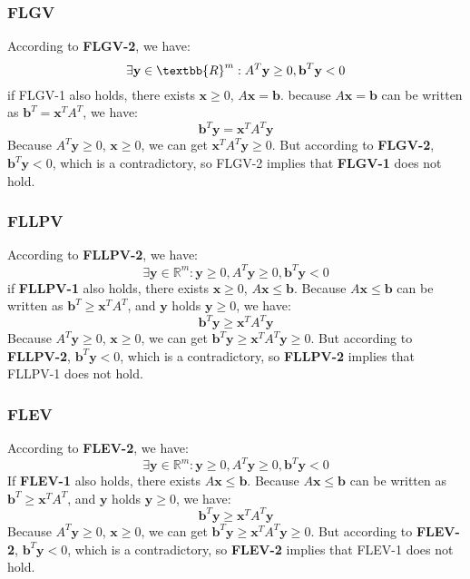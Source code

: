 \subsubsection*{FLGV}
According to \textbf{FLGV-2}, we have:
\[\exists \textbf{y} \in \textbb{R}^{m}: A^{T}\textbf{y} \geq 0, \textbf{b}^{T}\textbf{y} < 0 \]
if FLGV-1 also holds, there exists $\textbf{x} \geq 0$, $A\textbf{x}=\textbf{b}$.
\noindent
because $A\textbf{x}=\textbf{b}$ can be written as $\textbf{b}^{T} = \textbf{x}^{T}A^{T}$, we have:
\[\textbf{b}^{T}\textbf{y}=\textbf{x}^{T}A^{T}\textbf{y}\]
Because $A^{T}\textbf{y} \geq 0$, $\textbf{x} \geq 0$, we can get $\textbf{x}^{T}A^{T}\textbf{y} \geq 0$. But according to \textbf{FLGV-2}, $\textbf{b}^{T}\textbf{y} < 0$, which is a contradictory, so FLGV-2 implies that \textbf{FLGV-1} does not hold.
\subsubsection*{FLLPV}
According to \textbf{FLLPV-2}, we have:
\[\exists \textbf{y} \in \mathbb{R}^{m}: \textbf{y} \geq 0, A^{T}\textbf{y} \geq 0, \textbf{b}^{T}\textbf{y} < 0 \]
if \textbf{FLLPV-1} also holds, there exists $\textbf{x} \geq 0$, $A\textbf{x} \leq \textbf{b}$. Because $A\textbf{x} \leq \textbf{b}$ can be written as $\textbf{b}^{T} \geq \textbf{x}^{T}A^{T}$, and $\textbf{y}$ holds $\textbf{y} \geq 0$, we have:
\[\textbf{b}^{T}\textbf{y} \geq \textbf{x}^{T}A^{T}\textbf{y}\]
Because $A^{T}\textbf{y} \geq 0$, $\textbf{x} \geq 0$, we can get $\textbf{b}^{T}\textbf{y} \geq \textbf{x}^{T}A^{T}\textbf{y} \geq 0$.
But according to \textbf{FLLPV-2}, $\textbf{b}^{T}\textbf{y} < 0$, which is a contradictory, so \textbf{FLLPV-2} implies that FLLPV-1 does not hold.
\subsubsection*{FLEV}
According to \textbf{FLEV-2}, we have:
\[\exists \textbf{y} \in \mathbb{R}^{m}: \textbf{y} \geq 0, A^{T}\textbf{y} \geq 0, \textbf{b}^{T}\textbf{y} < 0 \]
If \textbf{FLEV-1} also holds, there exists $A\textbf{x} \leq \textbf{b}$.
Because $A\textbf{x} \leq \textbf{b}$ can be written as $\textbf{b}^{T} \geq \textbf{x}^{T}A^{T}$, and $\textbf{y}$ holds $\textbf{y} \geq 0$, we have:
\[\textbf{b}^{T}\textbf{y} \geq \textbf{x}^{T}A^{T}\textbf{y}\]
Because $A^{T}\textbf{y} \geq 0$, $\textbf{x} \geq 0$, we can get $\textbf{b}^{T}\textbf{y} \geq \textbf{x}^{T}A^{T}\textbf{y} \geq 0$.
But according to \textbf{FLEV-2}, $\textbf{b}^{T}\textbf{y} < 0$, which is a contradictory, so \textbf{FLEV-2} implies that FLEV-1 does not hold.
